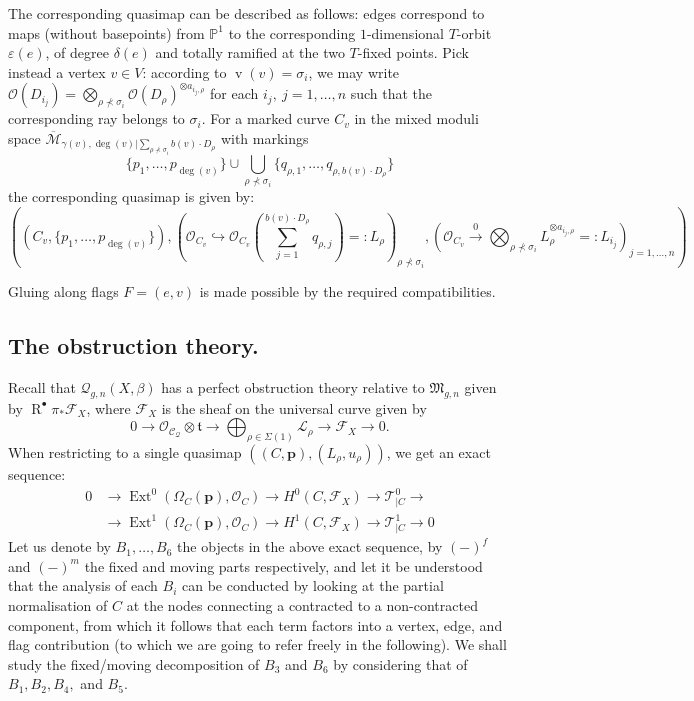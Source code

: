 \documentclass[11pt]{amsart}
\newcommand{\Q}[4]{\mathcal{Q}_{#1,#2}(#3,#4)}
\newcommand{\PP}{\mathbb P}
\newcommand{\OO}{\mathcal{O}}
\renewcommand{\to}{\rightarrow}
\newcommand{\F}{\mathcal F}
\newcommand{\Ext}{\operatorname{Ext}}
\newcommand{\R}{\operatorname{R}^{\bullet}}
\newcommand{\vv}{\operatorname{v}}
\theoremstyle{definition}
\theoremstyle{definition}
\begin{document}
The corresponding quasimap can be described as follows: edges correspond to maps (without basepoints) from $\PP^1$ to the corresponding $1$-dimensional $T$-orbit $\varepsilon(e)$, of degree $\delta(e)$ and totally ramified at the two $T$-fixed points. Pick instead a vertex $v\in V$: according to $\vv(v)=\sigma_i$, we may write $\OO(D_{i_j})=\bigotimes_{\rho\nprec\sigma_i} \OO(D_\rho)^{\otimes a_{i_j,\rho}}$ for each $i_j,\ j=1,\ldots,n$ such that the corresponding ray belongs to $\sigma_i$. For a marked curve $C_v$ in the mixed moduli space $\overline{\mathcal M}_{\gamma(v),\deg(v)|\sum_{\rho\nprec \sigma_i}b(v)\cdot D_\rho}$ with markings
\[
 \{p_1,\ldots,p_{\deg(v)}\}\cup\bigcup_{\rho\nprec\sigma_i}\{q_{\rho,1},\ldots,q_{\rho,b(v)\cdot D_{\rho}}\}
\]
the corresponding quasimap is given by:
\[
 \left((C_v,\{p_1,\ldots,p_{\deg(v)}\}),(\mathcal O_{C_v}\hookrightarrow\OO_{C_v}(\sum_{j=1}^{b(v)\cdot D_{\rho} }q_{\rho,j})=:L_\rho)_{\rho\nprec\sigma_i},(\mathcal O_{C_v}\xrightarrow{0}\bigotimes_{\rho\nprec\sigma_i} L_\rho^{\otimes a_{i_j,\rho}}=:L_{i_j})_{j=1,\ldots,n} \right)
\]

Gluing along flags $F=(e,v)$ is made possible by the required compatibilities.

\subsection{The obstruction theory.} Recall that $\Q{g}{n}{X}{\beta}$ has a perfect obstruction theory relative to $\mathfrak M_{g,n}$ given by $\R\pi_*\F_X$, where $\F_X$ is the sheaf on the universal curve given by
\begin{equation}\label{eqn:F}
 0\to\OO_{\mathcal C_\mathcal Q}\otimes \mathfrak t\to\bigoplus_{\rho\in\Sigma(1)}\mathcal L_\rho\to\F_X\to 0.
\end{equation}
When restricting to a single quasimap $\left((C,\mathbf p),(L_{\rho},u_{\rho})\right)$, we get an exact sequence:
\begin{align*}
 0&\to \Ext^0(\Omega_C(\mathbf p),\OO_C)\to H^0(C,\F_X)\to \mathcal T^0_{|C}\to \\
  &\to \Ext^1(\Omega_C(\mathbf p),\OO_C)\to H^1(C,\F_X)\to \mathcal T^1_{|C}\to 0
\end{align*}
Let us denote by $B_1,\ldots, B_6$ the objects in the above exact sequence, by $(-)^f$ and $(-)^m$ the fixed and moving parts respectively, and let it be understood that the analysis of each $B_i$ can be conducted by looking at the partial normalisation of $C$ at the nodes connecting a contracted to a non-contracted component, from which it follows that each term factors into a vertex, edge, and flag contribution (to which we are going to refer freely in the following). We shall study the fixed/moving decomposition of $B_3$ and $B_6$ by considering that of $B_1, B_2, B_4,$ and $B_5$.
\end{document}
